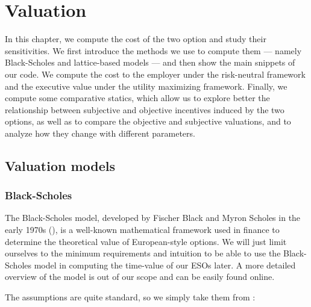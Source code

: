 \section{Valuation}

    In this chapter, we compute the cost of the two option and study their sensitivities. We first introduce the methods we use to compute them --- namely Black-Scholes and lattice-based models --- and then show the main snippets of our code. We compute the cost to the employer under the risk-neutral framework and the executive value under the utility maximizing framework. Finally, we compute some comparative statics, which allow us to explore better the relationship between subjective and objective incentives induced by the two options, as well as to compare the objective and subjective valuations, and to analyze how they change with different parameters.






\subsection{Valuation models} 

\subsubsection*{Black-Scholes}
    The Black-Scholes model, developed by Fischer Black and Myron Scholes in the early 1970s (\cite{black1973pricing}), is a well-known mathematical framework used in finance to determine the theoretical value of European-style options. We will just limit ourselves to the minimum requirements and intuition to be able to use the Black-Scholes model in computing the time-value of our ESOs later. A more detailed overview of the model is out of our scope and can be easily found online. 
    
    The assumptions are quite standard, so we simply take them from \cite{wiki:blackscholes}:

